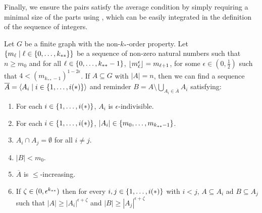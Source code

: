         Finally, we ensure the pairs satisfy the average condition by simply requiring a minimal size of the parts
        using ,
        which can be easily integrated in the definition of the sequence of integers.

        \begin{lemma} \label{lem:existance_of_ordered_f_indivisible_partitions_with_exceptions_bound}
            Let $G$ be a finite graph with the non-$k_{*}$-order property.
            Let $\{ m_\ell \mid \ell \in \{ 0, \dots, k_{**} \} \}$ be a sequence of non-zero natural numbers such that
            $n \geq m_0$ and for all $\ell \in \{ 0, \dots, k_{**}-1 \}$, $\left\lfloor m_\ell^\epsilon \right\rfloor = m_{\ell+1}$,
            for some $\epsilon \in (0, \frac{1}{2})$ such that $4 < (m_{k_{**}-1})^{1-2\epsilon}$.
            If $A \subseteq G$ with $|A| = n$, then we can find a sequence $\overline{A} = \left< A_i \mid i \in \{ 1, \dots, i(*) \} \right>$
            and reminder $B = A \setminus \bigcup_{A_i \in \overline{A}} A_i$ satisfying:
            \begin{enumerate}[label={\Roman*}., ref={\Roman*}, font=\rmfamily]
                \item \label{itm:existance_of_ordered_f_indivisible_partitions_with_exceptions_bound.1} For each $i \in \{ 1, \dots, i(*) \}$, $A_i$ is $\epsilon$-indivisible.
                \item \label{itm:existance_of_ordered_f_indivisible_partitions_with_exceptions_bound.2} For each $i \in \{ 1, \dots, i(*) \}$, $|A_i| \in \{ m_0, \dots, m_{k_{**}-1} \}$.
                \item \label{itm:existance_of_ordered_f_indivisible_partitions_with_exceptions_bound.3} $A_i \cap A_j = \emptyset$ for all $i \neq j$.
                \item \label{itm:existance_of_ordered_f_indivisible_partitions_with_exceptions_bound.4} $|B| < m_0$.
                \item \label{itm:existance_of_ordered_f_indivisible_partitions_with_exceptions_bound.5} $\overline{A}$ is $\leq$-increasing.
                \item \label{itm:existance_of_ordered_f_indivisible_partitions_with_exceptions_bound.6} If $\zeta \in ( 0,\epsilon^{k_{**}} )$ then for every $i,j \in \{ 1, \dots, i(*) \}$ with $i < j$,
                    $A \subseteq A_i$ ad $B \subseteq A_j$ such that $|A| \geq |A_i|^{\epsilon + \zeta}$ and $|B| \geq |A_j|^{\epsilon + \zeta}$

\end{enumerate}
\end{lemma}
